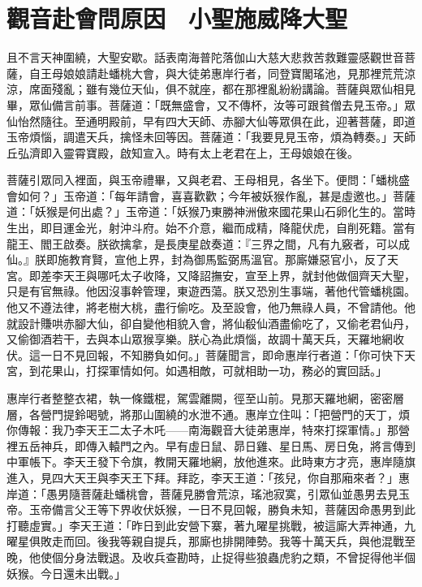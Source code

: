 
\chapter{觀音赴會問原因　小聖施威降大聖}

且不言天神圍繞，大聖安歇。話表南海普陀落伽山大慈大悲救苦救難靈感觀世音菩薩，自王母娘娘請赴蟠桃大會，與大徒弟惠岸行者，同登寶閣瑤池，見那裡荒荒涼涼，席面殘亂；雖有幾位天仙，俱不就座，都在那裡亂紛紛講論。菩薩與眾仙相見畢，眾仙備言前事。菩薩道：「既無盛會，又不傳杯，汝等可跟貧僧去見玉帝。」眾仙怡然隨往。至通明殿前，早有四大天師、赤腳大仙等眾俱在此，迎著菩薩，即道玉帝煩惱，調遣天兵，擒怪未回等因。菩薩道：「我要見見玉帝，煩為轉奏。」天師丘弘濟即入靈霄寶殿，啟知宣入。時有太上老君在上，王母娘娘在後。

菩薩引眾同入裡面，與玉帝禮畢，又與老君、王母相見，各坐下。便問：「蟠桃盛會如何？」玉帝道：「每年請會，喜喜歡歡；今年被妖猴作亂，甚是虛邀也。」菩薩道：「妖猴是何出處？」玉帝道：「妖猴乃東勝神洲傲來國花果山石卵化生的。當時生出，即目運金光，射沖斗府。始不介意，繼而成精，降龍伏虎，自削死籍。當有龍王、閻王啟奏。朕欲擒拿，是長庚星啟奏道：『三界之間，凡有九竅者，可以成仙。』朕即施教育賢，宣他上界，封為御馬監弼馬溫官。那廝嫌惡官小，反了天宮。即差李天王與哪吒太子收降，又降詔撫安，宣至上界，就封他做個齊天大聖，只是有官無祿。他因沒事幹管理，東遊西蕩。朕又恐別生事端，著他代管蟠桃園。他又不遵法律，將老樹大桃，盡行偷吃。及至設會，他乃無祿人員，不曾請他。他就設計賺哄赤腳大仙，卻自變他相貌入會，將仙殽仙酒盡偷吃了，又偷老君仙丹，又偷御酒若干，去與本山眾猴享樂。朕心為此煩惱，故調十萬天兵，天羅地網收伏。這一日不見回報，不知勝負如何。」菩薩聞言，即命惠岸行者道：「你可快下天宮，到花果山，打探軍情如何。如遇相敵，可就相助一功，務必的實回話。」

惠岸行者整整衣裙，執一條鐵棍，駕雲離闕，徑至山前。見那天羅地網，密密層層，各營門提鈴喝號，將那山圍繞的水泄不通。惠岸立住叫：「把營門的天丁，煩你傳報：我乃李天王二太子木吒——南海觀音大徒弟惠岸，特來打探軍情。」那營裡五岳神兵，即傳入轅門之內。早有虛日鼠、昴日雞、星日馬、房日兔，將言傳到中軍帳下。李天王發下令旗，教開天羅地網，放他進來。此時東方才亮，惠岸隨旗進入，見四大天王與李天王下拜。拜訖，李天王道：「孩兒，你自那廂來者？」惠岸道：「愚男隨菩薩赴蟠桃會，菩薩見勝會荒涼，瑤池寂寞，引眾仙並愚男去見玉帝。玉帝備言父王等下界收伏妖猴，一日不見回報，勝負未知，菩薩因命愚男到此打聽虛實。」李天王道：「昨日到此安營下寨，著九曜星挑戰，被這廝大弄神通，九曜星俱敗走而回。後我等親自提兵，那廝也排開陣勢。我等十萬天兵，與他混戰至晚，他使個分身法戰退。及收兵查勘時，止捉得些狼蟲虎豹之類，不曾捉得他半個妖猴。今日還未出戰。」

